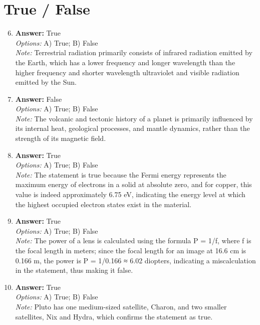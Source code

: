 \documentclass[12pt]{article}
\begin{document}
\section*{True / False}
\begin{enumerate}[label=\arabic*.]
\setcounter{enumi}{5}
\item \textbf{Answer:} True
\\ \textit{Options:} A) True; B) False
\\ \textit{Note:} Terrestrial radiation primarily consists of infrared radiation emitted by the Earth, which has a lower frequency and longer wavelength than the higher frequency and shorter wavelength ultraviolet and visible radiation emitted by the Sun.
\item \textbf{Answer:} False
\\ \textit{Options:} A) True; B) False
\\ \textit{Note:} The volcanic and tectonic history of a planet is primarily influenced by its internal heat, geological processes, and mantle dynamics, rather than the strength of its magnetic field.
\item \textbf{Answer:} True
\\ \textit{Options:} A) True; B) False
\\ \textit{Note:} The statement is true because the Fermi energy represents the maximum energy of electrons in a solid at absolute zero, and for copper, this value is indeed approximately 6.75 eV, indicating the energy level at which the highest occupied electron states exist in the material.
\item \textbf{Answer:} True
\\ \textit{Options:} A) True; B) False
\\ \textit{Note:} The power of a lens is calculated using the formula P = 1/f, where f is the focal length in meters; since the focal length for an image at 16.6 cm is 0.166 m, the power is P = 1/0.166 ≈ 6.02 diopters, indicating a miscalculation in the statement, thus making it false.
\item \textbf{Answer:} True
\\ \textit{Options:} A) True; B) False
\\ \textit{Note:} Pluto has one medium-sized satellite, Charon, and two smaller satellites, Nix and Hydra, which confirms the statement as true.
\end{enumerate}
\end{document}

